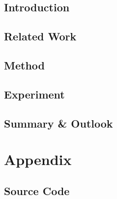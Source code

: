 \documentclass[twoside,a4paper,11pt,openright]{report}
\begin{document}
%
%




\cleardoublepage


\cleardoublepage

%



\tableofcontents

\cleardoublepage
{}
{}
\listoffigures

\cleardoublepage
{}
{}
\listoftables







%
%

\cleardoublepage
{}

\chapter{Introduction}


\chapter{Related Work}


\chapter{Method}

\chapter{Experiment}

\chapter{Summary \& Outlook}


%
%

\appendix
\part*{Appendix}
\markboth{}{}


\chapter{Source Code}




\printbibliography[heading=bibintoc]

\end{document}
